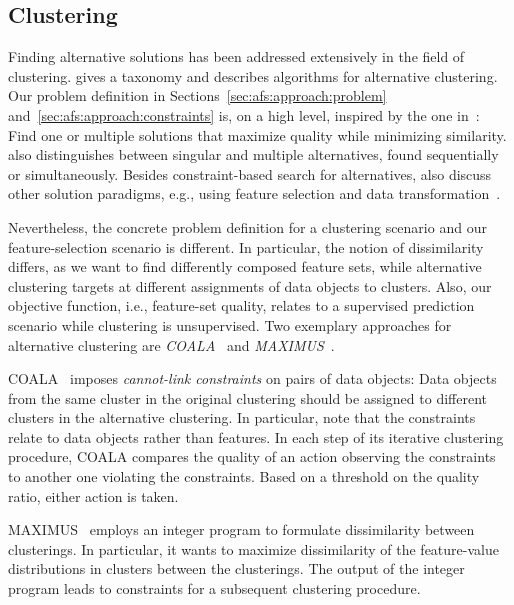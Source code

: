 \documentclass{article}
\theoremstyle{definition}
\begin{document}
\subsection{Clustering}
\label{sec:afs:related-work:clustering}

Finding alternative solutions has been addressed extensively in the field of clustering.
\cite{bailey2014alternative} gives a taxonomy and describes algorithms for alternative clustering.
Our problem definition in Sections~\ref{sec:afs:approach:problem} and~\ref{sec:afs:approach:constraints} is, on a high level, inspired by the one in~\cite{bailey2014alternative}:
Find one or multiple solutions that maximize quality while minimizing similarity.
\cite{bailey2014alternative} also distinguishes between singular and multiple alternatives, found sequentially or simultaneously.
Besides constraint-based search for alternatives, \cite{bailey2014alternative} also discuss other solution paradigms, e.g., using feature selection and data transformation~\cite{tao2012novel}.

Nevertheless, the concrete problem definition for a clustering scenario and our feature-selection scenario is different.
In particular, the notion of dissimilarity differs, as we want to find differently composed feature sets, while alternative clustering targets at different assignments of data objects to clusters.
Also, our objective function, i.e., feature-set quality, relates to a supervised prediction scenario while clustering is unsupervised.
Two exemplary approaches for alternative clustering are \emph{COALA}~\cite{bae2006coala} and \emph{MAXIMUS}~\cite{bae2010clustering}.

COALA~\cite{bae2006coala} imposes \emph{cannot-link constraints} on pairs of data objects:
Data objects from the same cluster in the original clustering should be assigned to different clusters in the alternative clustering.
In particular, note that the constraints relate to data objects rather than features.
In each step of its iterative clustering procedure, COALA compares the quality of an action observing the constraints to another one violating the constraints.
Based on a threshold on the quality ratio, either action is taken.

MAXIMUS~\cite{bae2010clustering} employs an integer program to formulate dissimilarity between clusterings.
In particular, it wants to maximize dissimilarity of the feature-value distributions in clusters between the clusterings.
The output of the integer program leads to constraints for a subsequent clustering procedure.
\end{document}
